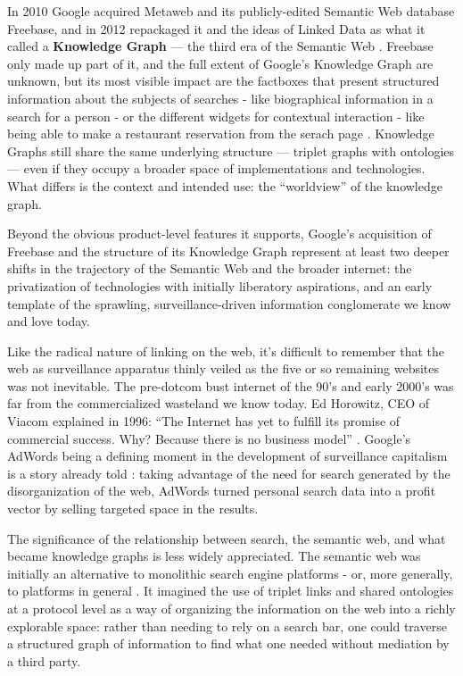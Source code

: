 In 2010 Google acquired Metaweb and its publicly-edited Semantic Web
database Freebase, and in 2012 repackaged it and the ideas of Linked
Data as what it called a \textbf{Knowledge Graph} --- the third era of
the Semantic Web \cite{singhalIntroducingKnowledgeGraph2012, iainFreebaseDeadLong2016} . Freebase only made up part of it, and the
full extent of Google's Knowledge Graph are unknown, but its most
visible impact are the factboxes that present structured information
about the subjects of searches - like biographical information in a
search for a person - or the different widgets for contextual
interaction - like being able to make a restaurant reservation from the
serach page \cite{noyIndustryscaleKnowledgeGraphs2019} .
Knowledge Graphs still share the same underlying structure --- triplet
graphs with ontologies --- even if they occupy a broader space of
implementations and technologies. What differs is the context and
intended use: the ``worldview'' of the knowledge graph.

Beyond the obvious product-level features it supports, Google's
acquisition of Freebase and the structure of its Knowledge Graph
represent at least two deeper shifts in the trajectory of the Semantic
Web and the broader internet: the privatization of technologies with
initially liberatory aspirations, and an early template of the
sprawling, surveillance-driven information conglomerate we know and love
today.

Like the radical nature of linking on the web, it's difficult to
remember that the web as surveillance apparatus thinly veiled as the
five or so remaining websites was not inevitable. The pre-dotcom bust
internet of the 90's and early 2000's was far from the commercialized
wasteland we know today. Ed Horowitz, CEO of Viacom explained in 1996:
``The Internet has yet to fulfill its promise of commercial success.
Why? Because there is no business model'' \cite{tarnoffInternetPeopleFight2022} . Google's AdWords being a defining
moment in the development of surveillance capitalism is a story already
told \cite{zuboffAgeSurveillanceCapitalism2019} : taking
advantage of the need for search generated by the disorganization of the
web, AdWords turned personal search data into a profit vector by selling
targeted space in the results.

The significance of the relationship between search, the semantic web,
and what became knowledge graphs is less widely appreciated. The
semantic web was initially an alternative to monolithic search engine
platforms - or, more generally, to platforms in general \cite{berners-leeSociallyAwareCloud2009} . It imagined the use of triplet
links and shared ontologies at a protocol level as a way of organizing
the information on the web into a richly explorable space: rather than
needing to rely on a search bar, one could traverse a structured graph
of information \cite{berners-leeLinkedData2006, berners-leeGoalsHumanDataInterface2010}  to find what one needed
without mediation by a third party.

